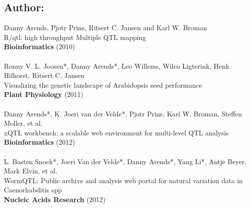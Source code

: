 \documentclass[8pt, twoside, a5paper]{report}
\newcommand{\authors}[1]{\small{#1}}
\newcommand{\bold}[1]{{\bfseries #1}}
\begin{document}
\subsection*{Author:}
  \authors{Danny Arends, Pjotr Prins, Ritsert C. Jansen and Karl W. Broman}\\
  R/qtl: high throughput Multiple QTL mapping\\
  \bold{Bioinformatics} (2010)\\\\
  \authors{Ronny V. L. Joosen*, Danny Arends*, Leo Willems, Wilco Ligterink, Henk Hilhorst, Ritsert C. Jansen}\\
  Visualizing the genetic landscape of Arabidopsis seed performance\\
  \bold{Plant Physiology} (2011)\\\\
  \authors{Danny Arends*, K. Joeri van der Velde*, Pjotr Prins, Karl W. Broman, Steffen Moller, et al.}\\
  xQTL workbench: a scalable web environment for multi-level QTL analysis\\
  \bold{Bioinformatics} (2012)\\\\
  \authors{L. Basten Snoek*, Joeri Van der Velde*, Danny Arends*, Yang Li*, Antje Beyer, Mark Elvin, et al.}\\
  WormQTL: Public archive and analysis web portal for natural variation data in Caenorhabditis spp\\
  \bold{Nucleic Acids Research} (2012)
\end{document}

